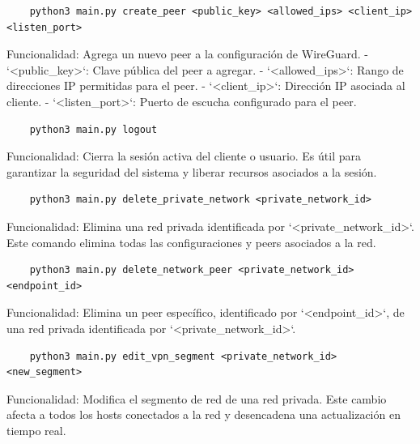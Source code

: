    
    
    \begin{verbatim}
    python3 main.py create_peer <public_key> <allowed_ips> <client_ip> <listen_port>
    \end{verbatim}
    Funcionalidad:  
    Agrega un nuevo peer a la configuración de WireGuard.  
    - `<public_key>`: Clave pública del peer a agregar.
    - `<allowed_ips>`: Rango de direcciones IP permitidas para el peer.
    - `<client_ip>`: Dirección IP asociada al cliente.
    - `<listen_port>`: Puerto de escucha configurado para el peer.
    
   
    
    \begin{verbatim}
    python3 main.py logout
    \end{verbatim}
    Funcionalidad:  
    Cierra la sesión activa del cliente o usuario. Es útil para garantizar la seguridad del sistema y liberar recursos asociados a la sesión.
    
   
    
    
    \begin{verbatim}
    python3 main.py delete_private_network <private_network_id>
    \end{verbatim}
    Funcionalidad:  
    Elimina una red privada identificada por `<private_network_id>`. Este comando elimina todas las configuraciones y peers asociados a la red.
    
    \begin{verbatim}
    python3 main.py delete_network_peer <private_network_id> <endpoint_id>
    \end{verbatim}
    Funcionalidad:  
    Elimina un peer específico, identificado por `<endpoint_id>`, de una red privada identificada por `<private_network_id>`.
    
    
    \begin{verbatim}
    python3 main.py edit_vpn_segment <private_network_id> <new_segment>
    \end{verbatim}
    Funcionalidad:  
    Modifica el segmento de red de una red privada. Este cambio afecta a todos los hosts conectados a la red y desencadena una actualización en tiempo real.
    
